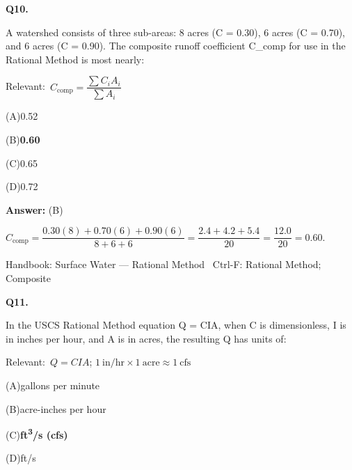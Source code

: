 \documentclass[11pt]{article}
\newcommand{\correct}[1]{\textbf{#1}\;{\color{accent}$\checkmark$}}
\newcommand{\optline}[2]{\par\noindent\hspace{1.2em}(#1)\hspace{0.6em}#2}
\begin{document}
\vspace{9pt}
\filbreak
\textbf{\color{accent}Q10.}\par\vspace{2pt}
A watershed consists of three sub-areas: 8 acres (C = 0.30), 6 acres (C = 0.70), and 6 acres (C = 0.90). The composite runoff coefficient C\_comp for use in the Rational Method is most nearly:\par\vspace{3pt}
{\small\color{soft}Relevant:}\ $C_{\text{comp}} = \dfrac{\sum C_i A_i}{\sum A_i}$\par\vspace{3pt}
\optline{A}{0.52}
\optline{B}{\correct{0.60}}
\optline{C}{0.65}
\optline{D}{0.72}
\par\vspace{3pt}
\vspace{2pt}\par\noindent\colorbox{boxbg}{\parbox{\dimexpr\linewidth-2\fboxsep\relax}{%
\vspace{2pt}\textbf{Answer:} (B)\par\vspace{2pt}
{\small $C_{\text{comp}} = \dfrac{0.30(8) + 0.70(6) + 0.90(6)}{8+6+6} = \dfrac{2.4+4.2+5.4}{20} = \dfrac{12.0}{20} = 0.60$.}\par\vspace{2pt}
{\footnotesize\color{soft}Handbook: Surface Water --- Rational Method \textbullet\ Ctrl-F: Rational Method; Composite}\vspace{2pt}
}}
\vspace{9pt}
\filbreak
\textbf{\color{accent}Q11.}\par\vspace{2pt}
In the USCS Rational Method equation Q = CIA, when C is dimensionless, I is in inches per hour, and A is in acres, the resulting Q has units of:\par\vspace{3pt}
{\small\color{soft}Relevant:}\ $Q = CIA$; $1\ \mathrm{in/hr} \times 1\ \mathrm{acre} \approx 1\ \mathrm{cfs}$\par\vspace{3pt}
\optline{A}{gallons per minute}
\optline{B}{acre-inches per hour}
\optline{C}{\correct{ft\textsuperscript{3}/s (cfs)}}
\optline{D}{ft/s}
\par\vspace{3pt}
\end{document}
